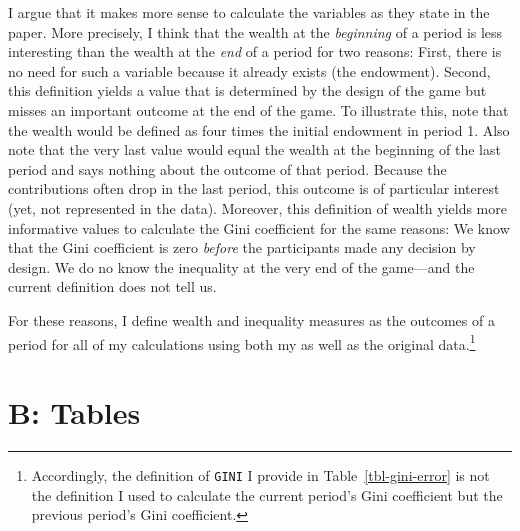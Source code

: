 \documentclass[
  authoryear,
  review,
  3p,
  onecolumn]{elsarticle}
\begin{document}
I argue that it makes more sense to calculate the variables as they
state in the paper. More precisely, I think that the wealth at the
\emph{beginning} of a period is less interesting than the wealth at the
\emph{end} of a period for two reasons: First, there is no need for such
a variable because it already exists (the endowment). Second, this
definition yields a value that is determined by the design of the game
but misses an important outcome at the end of the game. To illustrate
this, note that the wealth would be defined as four times the initial
endowment in period 1. Also note that the very last value would equal
the wealth at the beginning of the last period and says nothing about
the outcome of that period. Because the contributions often drop in the
last period, this outcome is of particular interest (yet, not
represented in the data). Moreover, this definition of wealth yields
more informative values to calculate the Gini coefficient for the same
reasons: We know that the Gini coefficient is zero \emph{before} the
participants made any decision by design. We do no know the inequality
at the very end of the game---and the current definition does not tell
us.

For these reasons, I define wealth and inequality measures as the
outcomes of a period for all of my calculations using both my as well as
the original data.\footnote{Accordingly, the definition of \texttt{GINI}
  I provide in Table~\ref{tbl-gini-error} is not the definition I used
  to calculate the current period's Gini coefficient but the previous
  period's Gini coefficient.}

\newpage{}

\hypertarget{b-tables}{%
\section{B: Tables}\label{b-tables}}
\end{document}
